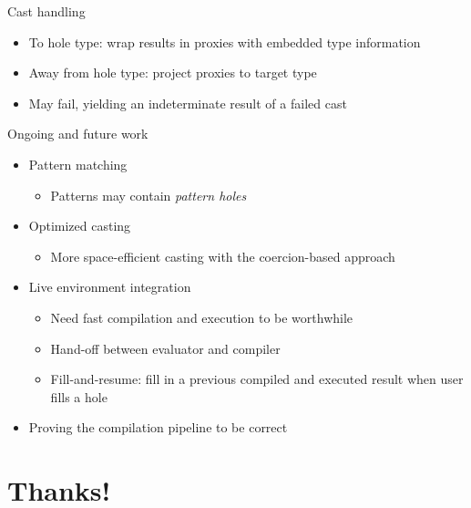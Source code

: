 \documentclass[aspectratio=169, xcolor={dvipsnames}, xtable]{beamer}
\begin{document}
\renewcommand{\currenttitle}{Cast handling}
\begin{frame}{\currenttitle}
  \begin{itemize}
    \item<+-> To hole type: wrap results in proxies with embedded type information
    \item<+-> Away from hole type: project proxies to target type
    \item<+-> May fail, yielding an indeterminate result of a failed cast
  \end{itemize}
  
  \vspace*{-1.5em}
\end{frame}

\renewcommand{\currenttitle}{Ongoing and future work}
\begin{frame}{\currenttitle}
  \begin{itemize}
    \item<+-> Pattern matching
      \begin{itemize}
        \item Patterns may contain \emph{pattern holes}
      \end{itemize}
    \item<+-> Optimized casting
      \begin{itemize}
        \item More space-efficient casting with the coercion-based approach
      \end{itemize}
    \item<+-> Live environment integration
      \begin{itemize}
        \item Need fast compilation and execution to be worthwhile
        \item Hand-off between evaluator and compiler
        \item Fill-and-resume: fill in a previous compiled and executed result when user fills a
          hole
      \end{itemize}
    \item<+-> Proving the compilation pipeline to be correct
  \end{itemize}
\end{frame}

\section*{Thanks!}
\end{document}
